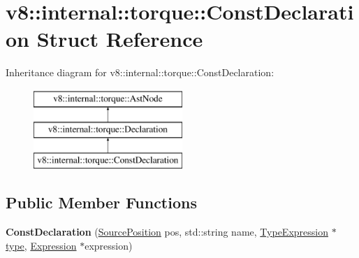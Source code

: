 \hypertarget{structv8_1_1internal_1_1torque_1_1ConstDeclaration}{}\section{v8\+:\+:internal\+:\+:torque\+:\+:Const\+Declaration Struct Reference}
\label{structv8_1_1internal_1_1torque_1_1ConstDeclaration}
Inheritance diagram for v8\+:\+:internal\+:\+:torque\+:\+:Const\+Declaration\+:\begin{figure}[H]
\begin{center}
\leavevmode
\includegraphics[height=3.000000cm]{structv8_1_1internal_1_1torque_1_1ConstDeclaration}
\end{center}
\end{figure}
\subsection*{Public Member Functions}
\begin{DoxyCompactItemize}
\item 
\mbox{\label{structv8_1_1internal_1_1torque_1_1ConstDeclaration_ad41def8b5280b4d9df89a25421667f0c}} 
{\bfseries Const\+Declaration} (\mbox{\hyperlink{structv8_1_1internal_1_1torque_1_1SourcePosition}{Source\+Position}} pos, std\+::string name, \mbox{\hyperlink{structv8_1_1internal_1_1torque_1_1TypeExpression}{Type\+Expression}} $\ast$\mbox{\hyperlink{classstd_1_1conditional_1_1type}{type}}, \mbox{\hyperlink{structv8_1_1internal_1_1torque_1_1Expression}{Expression}} $\ast$expression)
\end{DoxyCompactItemize}
